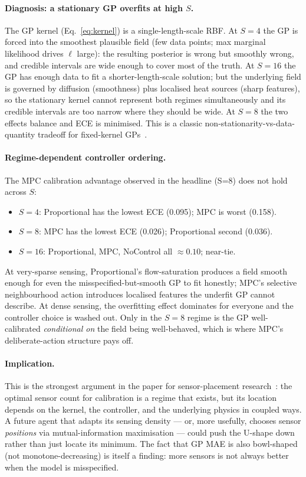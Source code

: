 \documentclass[11pt,letterpaper]{article}
\begin{document}
\paragraph{Diagnosis: a stationary GP overfits at high $S$.}
The GP kernel
(Eq.~\ref{eq:kernel}) is a single-length-scale RBF. At $S = 4$ the GP
is forced into the smoothest plausible field (few data points; max
marginal likelihood drives $\ell$ large): the resulting posterior is
wrong but smoothly wrong, and credible intervals are wide enough to
cover most of the truth. At $S = 16$ the GP has enough data to fit a
shorter-length-scale solution; but the underlying field is governed by
diffusion (smoothness) plus localised heat sources (sharp features),
so the stationary kernel cannot represent both regimes simultaneously
and its credible intervals are too narrow where they should be wide.
At $S = 8$ the two effects balance and ECE is minimised. This is a
classic non-stationarity-vs-data-quantity tradeoff for fixed-kernel
GPs~\citep{rasmussen2006}.

\paragraph{Regime-dependent controller ordering.}
The MPC calibration advantage observed in the headline (S=8) does not
hold across $S$:

\begin{itemize}
\itemsep0pt
\item $S = 4$: Proportional has the lowest ECE (0.095); MPC is worst (0.158).
\item $S = 8$: MPC has the lowest ECE (0.026); Proportional second (0.036).
\item $S = 16$: Proportional, MPC, NoControl all $\approx 0.10$; near-tie.
\end{itemize}

At very-sparse sensing, Proportional's flow-saturation produces a
field smooth enough for even the misspecified-but-smooth GP to fit
honestly; MPC's selective neighbourhood action introduces localised
features the underfit GP cannot describe. At dense sensing, the
overfitting effect dominates for everyone and the controller choice
is washed out. Only in the $S = 8$ regime is the GP well-calibrated
\emph{conditional on} the field being well-behaved, which is where
MPC's deliberate-action structure pays off.

\paragraph{Implication.}
This is the strongest argument in the paper for sensor-placement
research~\citep{krause2008}: the optimal sensor count for calibration
is a regime that exists, but its location depends on the kernel,
the controller, and the underlying physics in coupled ways. A future
agent that adapts its sensing density --- or, more usefully, chooses
sensor \emph{positions} via mutual-information maximisation --- could
push the U-shape down rather than just locate its minimum. The fact
that GP MAE is also bowl-shaped (not monotone-decreasing) is itself a
finding: more sensors is not always better when the model is
misspecified.
\end{document}
